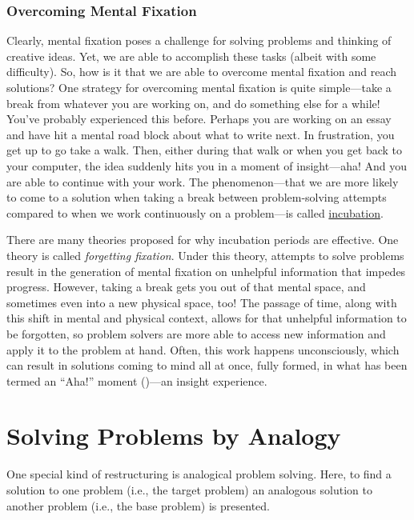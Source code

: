 \documentclass[
]{krantz}
\begin{document}
\subsubsection*{Overcoming Mental Fixation}\label{overcoming-mental-fixation}


Clearly, mental fixation poses a challenge for solving problems and thinking of creative ideas. Yet, we are able to accomplish these tasks (albeit with some difficulty). So, how is it that we are able to overcome mental fixation and reach solutions? One strategy for overcoming mental fixation is quite simple---take a break from whatever you are working on, and do something else for a while! You've probably experienced this before. Perhaps you are working on an essay and have hit a mental road block about what to write next. In frustration, you get up to go take a walk. Then, either during that walk or when you get back to your computer, the idea suddenly hits you in a moment of insight---aha! And you are able to continue with your work. The phenomenon---that we are more likely to come to a solution when taking a break between problem-solving attempts compared to when we work continuously on a problem---is called \hyperref[incubation]{incubation}.

There are many theories proposed for why incubation periods are effective. One theory is called \emph{forgetting fixation}. Under this theory, attempts to solve problems result in the generation of mental fixation on unhelpful information that impedes progress. However, taking a break gets you out of that mental space, and sometimes even into a new physical space, too! The passage of time, along with this shift in mental and physical context, allows for that unhelpful information to be forgotten, so problem solvers are more able to access new information and apply it to the problem at hand. Often, this work happens unconsciously, which can result in solutions coming to mind all at once, fully formed, in what has been termed an ``Aha!'' moment ()---an insight experience.

\section{Solving Problems by Analogy}\label{solving-problems-by-analogy}

One special kind of restructuring is analogical problem solving. Here, to find a solution to one problem (i.e., the target problem) an analogous solution to another problem (i.e., the base problem) is presented.
\end{document}
